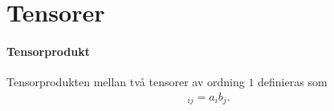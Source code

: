 \section{Tensorer}

\paragraph{Tensorprodukt}
Tensorprodukten mellan två tensorer av ordning $1$ definieras som
\begin{align*}
	[\tenprod{\vb{a}}{\vb{b}}]_{ij} = a_ib_j.
\end{align*}